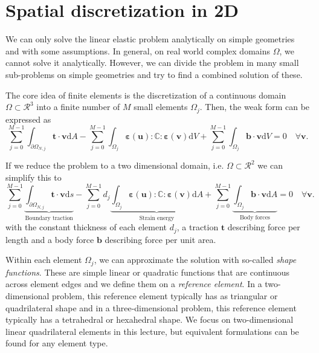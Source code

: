 \section{Spatial discretization in 2D}
We can only solve the linear elastic problem analytically on simple geometries and with some assumptions. In general, on real world complex domains $\Omega$, we cannot solve it analytically. However, we can divide the problem in many small sub-problems on simple geometries and try to find a combined solution of these.

The core idea of finite elements is the discretization of a continuous domain $\Omega \subset \mathcal{R}^3$ into a finite number of $M$ small elements $\Omega_j$. Then, the weak form can be expressed as 
\begin{equation}
    \sum_{j=0}^{M-1} \int_{\partial \Omega_{N,j}} \mathbf{t} \cdot \mathbf{v} \text{d}A
    - \sum_{j=0}^{M-1} \int_{\Omega_j} \pmb{\varepsilon}(\mathbf{u}) : \mathbb{C} :  \pmb{\varepsilon}(\mathbf{v}) \text{d}V
    + \sum_{j=0}^{M-1} \int_{\Omega_j} \mathbf{b} \cdot \mathbf{v} \text{d}V = 0 \quad \forall \mathbf{v}.
    \label{eq:discretized_weak_form_3d}
\end{equation}

If we reduce the problem to a two dimensional domain, i.e. $\Omega \subset \mathcal{R}^2$ we can simplify this to  
\begin{equation}
    \sum_{j=0}^{M-1} 
    \underbrace{\int_{\partial \Omega_{N,j}} \mathbf{t} \cdot \mathbf{v} \text{d}s}_\textrm{Boundary traction}
    - \sum_{j=0}^{M-1} d_j  
    \underbrace{\int_{\Omega_j} \pmb{\varepsilon}(\mathbf{u}) : \mathbb{C} :  \pmb{\varepsilon}(\mathbf{v}) \text{d}A}_\textrm{Strain energy}
    + \sum_{j=0}^{M-1} \underbrace{\int_{\Omega_j} \mathbf{b} \cdot \mathbf{v} \text{d}A}_\textrm{Body forces} = 0 \quad \forall \mathbf{v}.
    \label{eq:discretized_weak_form}
\end{equation}
with the constant thickness of each element $d_j$, a traction $\mathbf{t}$ describing force per length and a body force $\mathbf{b}$ describing force per unit area.

Within each element $\Omega_j$, we can approximate the solution with so-called \emph{shape functions}. These are simple linear or quadratic functions that are continuous across element edges and we define them on a \emph{reference element}. In a two-dimensional problem, this reference element typically has as triangular or quadrilateral shape and in a three-dimensional problem, this reference element typically has a tetrahedral or hexahedral shape. We focus on two-dimensional linear quadrilateral elements in this lecture, but equivalent formulations can be found for any element type. 


